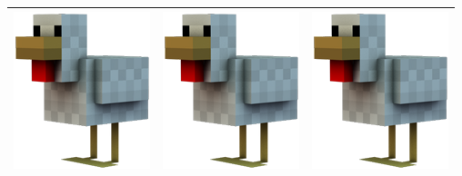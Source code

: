 \documentclass{article}
\begin{document}
\begin{center}
\begin{tabular}{ |c |c |c| }
			\hline
			\includegraphics[scale=0.3]{chicken.png} & \includegraphics[scale=0.15]{chicken.png} & \includegraphics[scale=0.3,angle=90]{chicken.png} \\ 
			\hline
		\end{tabular}
	\end{center}
\end{document}
